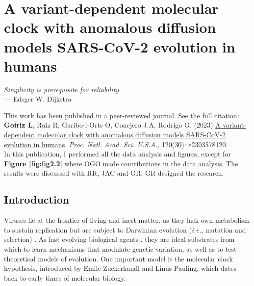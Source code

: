 \chapter{A variant-dependent molecular clock with anomalous diffusion models SARS-CoV-2 evolution in humans}\label{ch:chapter2}


\begin{flushright}
    \textit{Simplicity is prerequisite for reliability.}\\
    --- Edsger W. Dijkstra
\end{flushright}

\vspace{1cm}

\noindent This work has been published in a peer-reviewed journal. See the full citation:\\

\noindent \textbf{Goiriz L}, Ruiz R, Garibo-i-Orts O, Conejero J.A, Rodrigo G. (2023) \href{https://doi.org/10.1073/pnas.2303578120}{A variant-dependent molecular clock with anomalous diffusion models SARS-CoV-2 evolution in humans}. \textit{Proc. Natl. Acad. Sci. U.S.A.}, 120(30): e2303578120.\\

\noindent In this publication, I performed all the data analysis and figures, except for \textbf{Figure \ref{fig:fig2.2}} where OGO made contributions in the data analysis. The results were discussed with RR, JAC and GR. GR designed the research.

\vfill

\pagebreak

\sloppy

\section{Introduction}

Viruses lie at the frontier of living and inert matter, as they lack own metabolism to sustain replication but are subject to Darwinian evolution (\textit{i.e.}, mutation and selection) \cite{koonin2013}. As fast evolving biological agents \cite{drake1998}, they are ideal substrates from which to learn mechanisms that modulate genetic variation, as well as to test theoretical models of evolution. One important model is the molecular clock hypothesis, introduced by Emile Zuckerkandl and Linus
Pauling, which dates back to early times of molecular biology.

